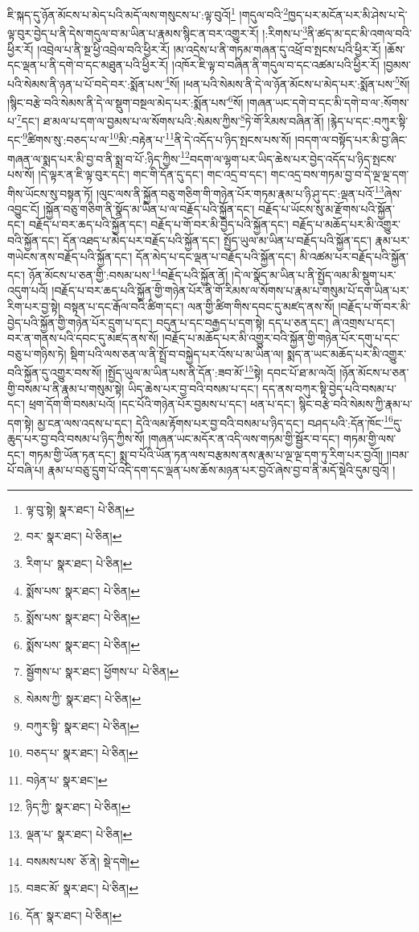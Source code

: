ཇི་སྐད་དུ་ཉོན་མོངས་པ་མེད་པའི་མདོ་ལས་གསུངས་པ་:ལྟ་བུའོ།\footnote{ལྟ་བུ་སྟེ།  སྣར་ཐང་།  པེ་ཅིན། } །གདུལ་བའི་\footnote{བར་  སྣར་ཐང་།  པེ་ཅིན། }ཁྱད་པར་མངོན་པར་མི་ཤེས་པ་དེ་ལྟ་བུར་བྱེད་པ་ནི་དེས་གདུལ་བ་མ་ཡིན་པ་རྣམས་སྙིང་ན་བར་འགྱུར་རོ། །:རིགས་པ་\footnote{རིག་པ་  སྣར་ཐང་།  པེ་ཅིན། }ནི་ཚད་མ་དང་མི་འགལ་བའི་ཕྱིར་རོ། །འབྲེལ་པ་ནི་སྔ་ཕྱི་འབྲེལ་བའི་ཕྱིར་རོ། །མ་འདྲེས་པ་ནི་གཏམ་གཞན་དུ་འཕྲོ་བ་སྤངས་པའི་ཕྱིར་རོ། །ཆོས་དང་ལྡན་པ་ནི་དགེ་བ་དང་མཐུན་པའི་ཕྱིར་རོ། །འཁོར་ཇི་ལྟ་བ་བཞིན་ནི་གདུལ་བ་དང་འཚམ་པའི་ཕྱིར་རོ། །བྱམས་པའི་སེམས་ནི་ཉན་པ་པོ་བདེ་བར་:སྨོན་པས་\footnote{སྨོས་པས་  སྣར་ཐང་།  པེ་ཅིན། }སོ། །ཕན་པའི་སེམས་ནི་དེ་ལ་ཉོན་མོངས་པ་མེད་པར་:སྨོན་པས་\footnote{སྨོས་པས་  སྣར་ཐང་།  པེ་ཅིན། }སོ། །སྙིང་བརྩེ་བའི་སེམས་ནི་དེ་ལ་སྡུག་བསྔལ་མེད་པར་:སྨོན་པས་\footnote{སྨོས་པས་  སྣར་ཐང་།  པེ་ཅིན། }སོ། །གཞན་ཡང་དགེ་བ་དང་མི་དགེ་བ་ལ་:སོགས་པ་\footnote{སྦྱོགས་པ་  སྣར་ཐང་། ཕྱོགས་པ་  པེ་ཅིན། }དང་། ཐ་མལ་པ་དག་ལ་བྱམས་པ་ལ་སོགས་པའི་:སེམས་ཀྱིས་\footnote{སེམས་ཀྱི་  སྣར་ཐང་།  པེ་ཅིན། }ཏེ་གོ་རིམས་བཞིན་ནོ། །རྙེད་པ་དང་:བཀུར་སྟི་དང་\footnote{བཀུར་སྟི་  སྣར་ཐང་།  པེ་ཅིན། }ཚིགས་སུ་:བཅད་པ་ལ་\footnote{བཅད་པ་  སྣར་ཐང་།  པེ་ཅིན། }མི་:བརྟེན་པ་\footnote{བཉེན་པ་  སྣར་ཐང་། }ནི་དེ་འདོད་པ་ཉིད་སྤངས་པས་སོ། །བདག་ལ་བསྟོད་པར་མི་བྱ་ཞིང་གཞན་ལ་སྨད་པར་མི་བྱ་བ་ནི་སྨྲ་བ་པོ་:ཉིད་ཀྱིས་\footnote{ཉིད་ཀྱི་  སྣར་ཐང་།  པེ་ཅིན། }བདག་ལ་ལྷག་པར་ཡིད་ཆེས་པར་བྱེད་འདོད་པ་ཉིད་སྤངས་པས་སོ། །དེ་ལྟར་ན་ཇི་ལྟ་བུར་དང་། གང་གི་དོན་དུ་དང་། གང་འདྲ་བ་དང་། གང་འདྲ་བས་གཏམ་བྱ་བ་དེ་ལྔ་ལྔ་དག་གིས་ཡོངས་སུ་བསྟན་ཏོ། །ལུང་ལས་ནི་སྐྱོན་བཅུ་གཅིག་གི་གཉེན་པོར་གཏམ་རྣམ་པ་ཉི་ཤུ་དང་:ལྡན་པའོ་\footnote{ལྡན་པ་  སྣར་ཐང་།  པེ་ཅིན། }ཞེས་འབྱུང་ངོ། །སྐྱོན་བཅུ་གཅིག་ནི་སྣོད་མ་ཡིན་པ་ལ་བརྗོད་པའི་སྐྱོན་དང་། བརྗོད་པ་ཡོངས་སུ་མ་རྫོགས་པའི་སྐྱོན་དང་། བརྗོད་པ་བར་ཆད་པའི་སྐྱོན་དང་། བརྗོད་པ་གོ་བར་མི་བྱེད་པའི་སྐྱོན་དང་། བརྗོད་པ་མཆོད་པར་མི་འགྱུར་བའི་སྐྱོན་དང་། དོན་འཐད་པ་མེད་པར་བརྗོད་པའི་སྐྱོན་དང་། སྤྱོད་ཡུལ་མ་ཡིན་པ་བརྗོད་པའི་སྐྱོན་དང་། རྣམ་པར་གཡེངས་ནས་བརྗོད་པའི་སྐྱོན་དང་། དོན་མེད་པ་དང་ལྡན་པ་བརྗོད་པའི་སྐྱོན་དང་། མི་འཚམ་པར་བརྗོད་པའི་སྐྱོན་དང་། ཉོན་མོངས་པ་ཅན་གྱི་:བསམ་པས་\footnote{བསམས་པས་  ཅོ་ནེ།  སྡེ་དགེ། }བརྗོད་པའི་སྐྱོན་ནོ། །དེ་ལ་སྣོད་མ་ཡིན་པ་ནི་སྤྱོད་ལམ་མི་སྡུག་པར་འདུག་པའོ། །བརྗོད་པ་བར་ཆད་པའི་སྐྱོན་གྱི་གཉེན་པོར་ནི་གོ་རིམས་ལ་སོགས་པ་རྣམ་པ་གསུམ་པོ་དག་ཡིན་པར་རིག་པར་བྱ་སྟེ། བསྟན་པ་དང་རྒོལ་བའི་ཚིག་དང་། ལན་གྱི་ཚིག་གིས་དབང་དུ་མཛད་ནས་སོ། །བརྗོད་པ་གོ་བར་མི་བྱེད་པའི་སྐྱོན་གྱི་གཉེན་པོར་དྲུག་པ་དང་། བདུན་པ་དང་བརྒྱད་པ་དག་སྟེ། དད་པ་ཅན་དང་། ཞེ་འགྲས་པ་དང་། བར་ན་གནས་པའི་དབང་དུ་མཛད་ནས་སོ། །བརྗོད་པ་མཆོད་པར་མི་འགྱུར་བའི་སྐྱོན་གྱི་གཉེན་པོར་དགུ་པ་དང་བཅུ་པ་གཉིས་ཏེ། སྡིག་པའི་ལས་ཅན་ལ་ནི་སྤྲོ་བ་བསྐྱེད་པར་འོས་པ་མ་ཡིན་ལ། སྨད་ན་ཡང་མཆོད་པར་མི་འགྱུར་བའི་སྐྱོན་དུ་འགྱུར་བས་སོ། །སྤྱོད་ཡུལ་མ་ཡིན་པས་ནི་དོན་:ཟབ་མོ་\footnote{བཟང་མོ་  སྣར་ཐང་།  པེ་ཅིན། }སྟེ། དབང་པོ་ཐ་མ་ལའོ། །ཉོན་མོངས་པ་ཅན་གྱི་བསམ་པ་ནི་རྣམ་པ་གསུམ་སྟེ། ཡིད་ཆེས་པར་བྱ་བའི་བསམ་པ་དང་། དད་ནས་བཀུར་སྟི་བྱེད་པའི་བསམ་པ་དང་། ཕྲག་དོག་གི་བསམ་པའོ། །དང་པོའི་གཉེན་པོར་བྱམས་པ་དང་། ཕན་པ་དང་། སྙིང་བརྩེ་བའི་སེམས་ཀྱི་རྣམ་པ་དག་སྟེ། མྱ་ངན་ལས་འདས་པ་དང་། དེའི་ལམ་རྟོགས་པར་བྱ་བའི་བསམ་པ་ཉིད་དང་། བཤད་པའི་:དོན་ཁོང་\footnote{དོན་  སྣར་ཐང་།  པེ་ཅིན། }དུ་ཆུད་པར་བྱ་བའི་བསམ་པ་ཉིད་ཀྱིས་སོ། །གཞན་ཡང་མདོར་ན་འདི་ལས་གཏམ་གྱི་སྦྱོར་བ་དང་། གཏམ་གྱི་ལས་དང་། གཏམ་གྱི་ཡོན་ཏན་དང་། སྨྲ་བ་པོའི་ཡོན་ཏན་ལས་བརྩམས་ནས་རྣམ་པ་ལྔ་ལྔ་དག་ཏུ་རིག་པར་བྱའོ།། །།བམ་པོ་བཞི་པ། རྣམ་པ་བཅུ་དྲུག་པོ་འདི་དག་དང་ལྡན་པས་ཆོས་མཉན་པར་བྱའོ་ཞེས་བྱ་བ་ནི་མདོ་སྡེའི་དུམ་བུའོ། །
